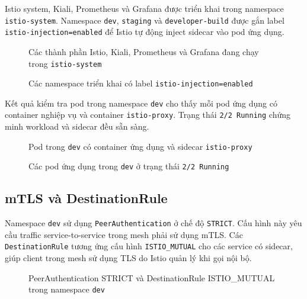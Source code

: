Istio system, Kiali, Prometheus và Grafana được triển khai trong namespace \texttt{istio-system}. Namespace \texttt{dev}, \texttt{staging} và \texttt{developer-build} được gắn label \texttt{istio-injection=enabled} để Istio tự động inject sidecar vào pod ứng dụng.

\begin{figure}[H]
\centering
{}
\caption{Các thành phần Istio, Kiali, Prometheus và Grafana đang chạy trong \texttt{istio-system}}
\end{figure}

\begin{figure}[H]
\centering
{}
\caption{Các namespace triển khai có label \texttt{istio-injection=enabled}}
\end{figure}

Kết quả kiểm tra pod trong namespace \texttt{dev} cho thấy mỗi pod ứng dụng có container nghiệp vụ và container \texttt{istio-proxy}. Trạng thái \texttt{2/2 Running} chứng minh workload và sidecar đều sẵn sàng.

\begin{figure}[H]
\centering
{}
\caption{Pod trong \texttt{dev} có container ứng dụng và sidecar \texttt{istio-proxy}}
\end{figure}

\begin{figure}[H]
\centering
{}
\caption{Các pod ứng dụng trong \texttt{dev} ở trạng thái \texttt{2/2 Running}}
\end{figure}

\subsection{mTLS và DestinationRule}

Namespace \texttt{dev} sử dụng \texttt{PeerAuthentication} ở chế độ \texttt{STRICT}. Cấu hình này yêu cầu traffic service-to-service trong mesh phải sử dụng mTLS. Các \texttt{DestinationRule} tương ứng cấu hình \texttt{ISTIO\_MUTUAL} cho các service có sidecar, giúp client trong mesh sử dụng TLS do Istio quản lý khi gọi nội bộ.

\begin{figure}[H]
\centering
{}
\caption{PeerAuthentication STRICT và DestinationRule ISTIO\_MUTUAL trong namespace \texttt{dev}}
\end{figure}

